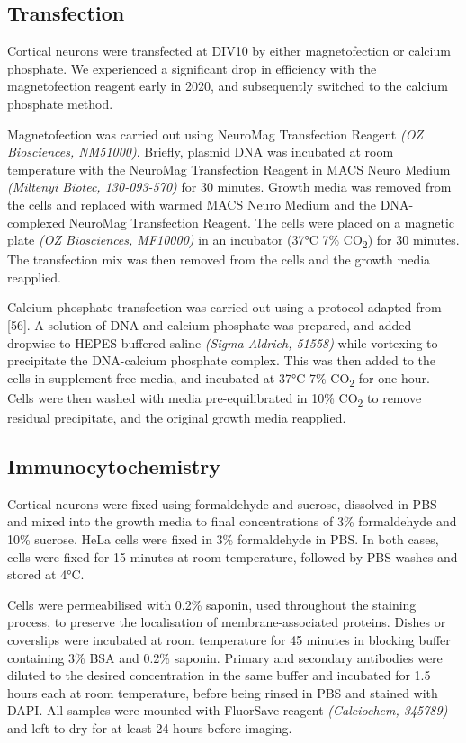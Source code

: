 \documentclass[
  12pt,
  a4paper,
]{book}
\begin{document}
\hypertarget{transfection}{%
\subsection{Transfection}\label{transfection}}

Cortical neurons were transfected at DIV10 by either magnetofection or calcium phosphate. We experienced a significant drop in efficiency with the magnetofection reagent early in 2020, and subsequently switched to the calcium phosphate method.

Magnetofection was carried out using NeuroMag Transfection Reagent \emph{(OZ Biosciences, NM51000)}. Briefly, plasmid DNA was incubated at room temperature with the NeuroMag Transfection Reagent in MACS Neuro Medium \emph{(Miltenyi Biotec, 130-093-570)} for 30 minutes. Growth media was removed from the cells and replaced with warmed MACS Neuro Medium and the DNA-complexed NeuroMag Transfection Reagent. The cells were placed on a magnetic plate \emph{(OZ Biosciences, MF10000)} in an incubator (37°C 7\% CO\textsubscript{2}) for 30 minutes. The transfection mix was then removed from the cells and the growth media reapplied.

Calcium phosphate transfection was carried out using a protocol adapted from {[}56{]}. A solution of DNA and calcium phosphate was prepared, and added dropwise to HEPES-buffered saline \emph{(Sigma-Aldrich, 51558)} while vortexing to precipitate the DNA-calcium phosphate complex. This was then added to the cells in supplement-free media, and incubated at 37°C 7\% CO\textsubscript{2} for one hour. Cells were then washed with media pre-equilibrated in 10\% CO\textsubscript{2} to remove residual precipitate, and the original growth media reapplied.

\hypertarget{immuno}{%
\subsection{Immunocytochemistry}\label{immuno}}

Cortical neurons were fixed using formaldehyde and sucrose, dissolved in PBS and mixed into the growth media to final concentrations of 3\% formaldehyde and 10\% sucrose. HeLa cells were fixed in 3\% formaldehyde in PBS. In both cases, cells were fixed for 15 minutes at room temperature, followed by PBS washes and stored at 4°C.

Cells were permeabilised with 0.2\% saponin, used throughout the staining process, to preserve the localisation of membrane-associated proteins. Dishes or coverslips were incubated at room temperature for 45 minutes in blocking buffer containing 3\% BSA and 0.2\% saponin. Primary and secondary antibodies were diluted to the desired concentration in the same buffer and incubated for 1.5 hours each at room temperature, before being rinsed in PBS and stained with DAPI. All samples were mounted with FluorSave reagent \emph{(Calciochem, 345789)} and left to dry for at least 24 hours before imaging.
\end{document}
